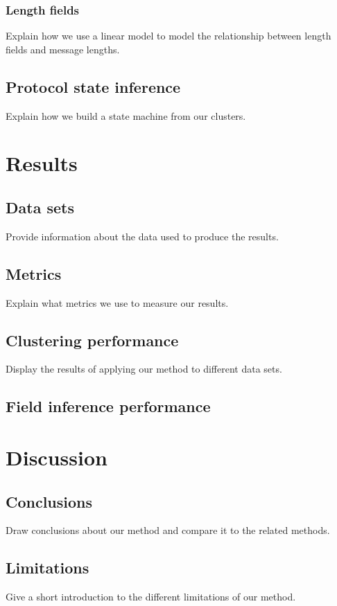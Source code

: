 \documentclass[a4paper]{report}
\begin{document}
\subsection{Length fields}
Explain how we use a linear model to model the relationship between length
fields and message lengths.

\section{Protocol state inference}
Explain how we build a state machine from our clusters.

\chapter{Results}

\section{Data sets}
Provide information about the data used to produce the results.

\section{Metrics}
Explain what metrics we use to measure our results.

\section{Clustering performance}
Display the results of applying our method to different data sets.

\section{Field inference performance}

\chapter{Discussion}

\section{Conclusions}
Draw conclusions about our method and compare it to the related methods.

\section{Limitations}
Give a short introduction to the different limitations of our method.
\end{document}
